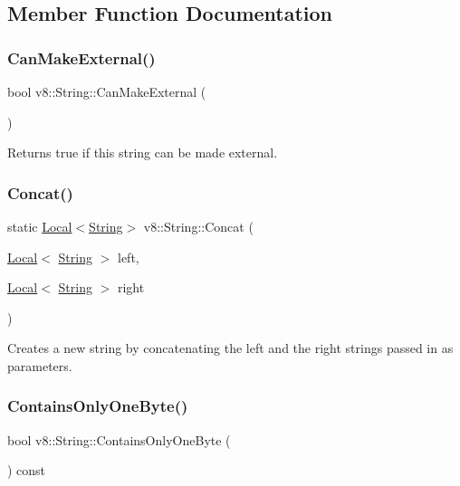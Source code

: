 \subsection{Member Function Documentation}
\mbox{\label{classv8_1_1String_a0fe076838af046506ffebbfadcde812a}} 
\subsubsection{\texorpdfstring{Can\+Make\+External()}{CanMakeExternal()}}
{\footnotesize\ttfamily bool v8\+::\+String\+::\+Can\+Make\+External (\begin{DoxyParamCaption}{ }\end{DoxyParamCaption})}

Returns true if this string can be made external. \mbox{\label{classv8_1_1String_ae72b61a78cef5d2916a87d9032c7fd34}} 
\subsubsection{\texorpdfstring{Concat()}{Concat()}}
{\footnotesize\ttfamily static \mbox{\hyperlink{classv8_1_1Local}{Local}}$<$\mbox{\hyperlink{classv8_1_1String}{String}}$>$ v8\+::\+String\+::\+Concat (\begin{DoxyParamCaption}\item[{\mbox{\hyperlink{classv8_1_1Local}{Local}}$<$ \mbox{\hyperlink{classv8_1_1String}{String}} $>$}]{left,  }\item[{\mbox{\hyperlink{classv8_1_1Local}{Local}}$<$ \mbox{\hyperlink{classv8_1_1String}{String}} $>$}]{right }\end{DoxyParamCaption})\hspace{0.3cm}{\ttfamily [static]}}

Creates a new string by concatenating the left and the right strings passed in as parameters. \mbox{\label{classv8_1_1String_a29b9bc5f71fba74af478e806b9d6a1d6}} 
\subsubsection{\texorpdfstring{Contains\+Only\+One\+Byte()}{ContainsOnlyOneByte()}}
{\footnotesize\ttfamily bool v8\+::\+String\+::\+Contains\+Only\+One\+Byte (\begin{DoxyParamCaption}{ }\end{DoxyParamCaption}) const}

